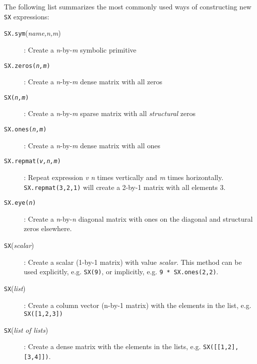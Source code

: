 \documentclass[a4paper,12pt]{book}
\newcommand{\CasADi}{\texttt{CasADi}\xspace}
\newcounter{pytexcount}
\newcounter{pytexsubcount}
\renewenvironment{pytex}
{\addtocounter{pytexsubcount}{1}%
\begin{rawhtml}
<div style="color: black; background-color: \#b9c8db;  border-style: dotted; border-width: 1px; padding:2px;padding-left:1em" >
<pre>
\end{rawhtml}
}%
{\begin{rawhtml}
</pre>
</div>
<div style="color: black; background-color: \#fffff;  border-style: solid; border-width: 1px; padding:2px;padding-left:1em;margin-left:1em;" >\end{rawhtml}%
\verbatiminputeval{pytex_\alph{pytexcount}_\arabic{pytexsubcount}.log}%
\begin{rawhtml}
</div>
\end{rawhtml}
}
\begin{document}
The following list summarizes the most commonly used ways of constructing new \texttt{SX} expressions:
\begin{description}
  \item[\texttt{SX.sym}(\emph{name,n,m})]: Create a \emph{n}-by-\emph{m} symbolic primitive
  \item[\texttt{SX.zeros(\emph{n,m})}]: Create a \emph{n}-by-\emph{m} dense matrix with all zeros
  \item[\texttt{SX(\emph{n,m})}]: Create a \emph{n}-by-\emph{m} sparse matrix with all \emph{structural} zeros
  \item[\texttt{SX.ones(\emph{n,m})}]: Create a \emph{n}-by-\emph{m} dense matrix with all ones
  \item[\texttt{SX.repmat(\emph{v,n,m})}]: Repeat expression \emph{v} \emph{n} times vertically and \emph{m} times horizontally. \verb|SX.repmat(3,2,1)| will create a 2-by-1 matrix with all elements 3.
  \item[\texttt{SX.eye(\emph{n})}]: Create a \emph{n}-by-\emph{n} diagonal matrix with ones on the diagonal and structural zeros elsewhere.
  \item[\texttt{SX}(\emph{scalar})]: Create a scalar (1-by-1 matrix) with value \emph{scalar}. This method can be used explicitly, e.g. \verb|SX(9)|, or implicitly, e.g. \verb|9 * SX.ones(2,2)|.
  \item[\texttt{SX}(\emph{list})]: Create a column vector (n-by-1 matrix) with the elements in the list, e.g. \verb|SX([1,2,3])|
  \item[\texttt{SX}(\emph{list of lists})]: Create a dense matrix with the elements in the lists, e.g. \verb|SX([[1,2],[3,4]])|.
\end{description}



\end{document}
